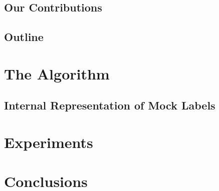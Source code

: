 \documentclass[sigconf]{acmart}
\begin{document}
\subsection{Our Contributions}

\subsection{Outline}



\section{The Algorithm}

\subsection{Internal Representation of Mock Labels}

\section{Experiments}

\section{Conclusions}



\end{document}
